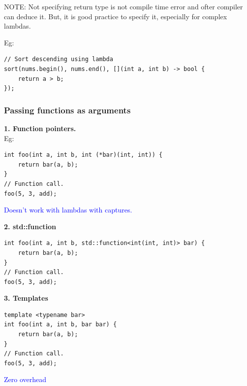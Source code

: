 NOTE: Not specifying return type is not compile time error and ofter compiler can deduce it.
But, it is good practice to specify it, especially for complex lambdas.

Eg:
\begin{mdframed}[nobreak=true,backgroundcolor=gray!10,linecolor=Firebrick4]
\begin{verbatim}
// Sort descending using lambda
sort(nums.begin(), nums.end(), [](int a, int b) -> bool {
    return a > b;
});
\end{verbatim}
\end{mdframed}

\subsubsection{Passing functions as arguments}
\textbf{1. Function pointers.}\\
Eg:
\begin{mdframed}[nobreak=true,backgroundcolor=gray!10,linecolor=Firebrick4]
\begin{verbatim}
int foo(int a, int b, int (*bar)(int, int)) {
    return bar(a, b);
} 
// Function call.
foo(5, 3, add);
\end{verbatim}
\end{mdframed}

\textcolor{blue}{Doesn't work with lambdas with captures.}

\textbf{2. std::function}
\begin{mdframed}[nobreak=true,backgroundcolor=gray!10,linecolor=Firebrick4]
\begin{verbatim}
int foo(int a, int b, std::function<int(int, int)> bar) {
    return bar(a, b);
} 
// Function call.
foo(5, 3, add);
\end{verbatim}
\end{mdframed}

\vfill\null
\columnbreak

\textbf{3. Templates}

\begin{mdframed}[nobreak=true,backgroundcolor=gray!10,linecolor=Firebrick4]
\begin{verbatim}
template <typename bar>    
int foo(int a, int b, bar bar) {
    return bar(a, b);
}
// Function call.
foo(5, 3, add);
\end{verbatim}
\end{mdframed}

\textcolor{blue}{Zero overhead}